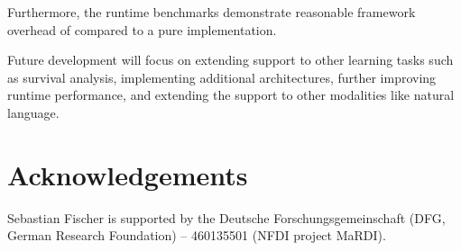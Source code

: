 \documentclass[article]{jss}
\theoremstyle{definition}
\begin{document}
Furthermore, the runtime benchmarks demonstrate reasonable framework overhead of \mlrttorch{} compared to a pure \torch{} implementation.

Future development will focus on extending support to other learning tasks such as survival analysis, implementing additional architectures, further improving runtime performance, and extending the support to other modalities like natural language.

%

\section*{Acknowledgements}

Sebastian Fischer is supported by the Deutsche Forschungsgemeinschaft (DFG, German Research Foundation) – 460135501 (NFDI project MaRDI).


\end{document}
